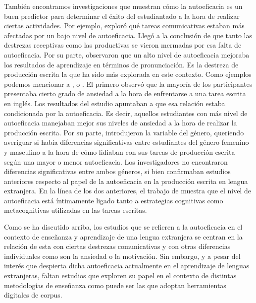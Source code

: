 También encontramos investigaciones que muestran cómo la autoeficacia es
un buen predictor para determinar el éxito del estudiantado a la hora de
realizar ciertas actividades. Por ejemplo, \textcite{waddington2019developing} exploró qué
tareas comunicativas estaban más afectadas por un bajo nivel de
autoeficacia. Llegó a la conclusión de que tanto las destrezas
receptivas como las productivas se vieron mermadas por esa falta de
autoeficacia. Por su parte, \textcite{sardegna2018self} observaron que
un alto nivel de autoeficacia mejoraba los resultados de aprendizaje en
términos de pronunciación. Es la destreza de producción escrita la que
ha sido más explorada en este contexto. Como ejemplos podemos mencionar
a \textcite{woodrow2011college}, \textcite{villalon2013high} o \textcite{teng2021individual}. El
primero observó que la mayoría de los participantes presentaba cierto
grado de ansiedad a la hora de enfrentarse a una tarea escrita en
inglés. Los resultados del estudio apuntaban a que esa relación estaba
condicionada por la autoeficacia. Es decir, aquellos estudiantes con más
nivel de autoeficacia manejaban mejor sus niveles de ansiedad a la hora
de realizar la producción escrita. Por su parte, \textcite{villalon2013high} introdujeron la variable del género, queriendo averiguar
si había diferencias significativas entre estudiantes del género
femenino y masculino a la hora de cómo lidiaban con sus tareas de
producción escrita según una mayor o menor autoeficacia. Los
investigadores no encontraron diferencias significativas entre ambos
géneros, si bien confirmaban estudios anteriores respecto al papel de la
autoeficacia en la producción escrita en lengua extranjera. En la línea
de los dos anteriores, el trabajo de \textcite{teng2021individual} muestra que el nivel de
autoeficacia está íntimamente ligado tanto a estrategias cognitivas como
metacognitivas utilizadas en las tareas escritas.

Como se ha discutido arriba, los estudios que se refieren a la
autoeficacia en el contexto de enseñanza y aprendizaje de una lengua
extranjera se centran en la relación de esta con ciertas destrezas
comunicativas y con otras diferencias individuales como son la ansiedad
o la motivación. Sin embargo, y a pesar del interés que despierta dicha
autoeficacia actualmente en el aprendizaje de lenguas extranjeras,
faltan estudios que exploren su papel en el contexto de distintas
metodologías de enseñanza como puede ser las que adoptan herramientas
digitales de corpus.